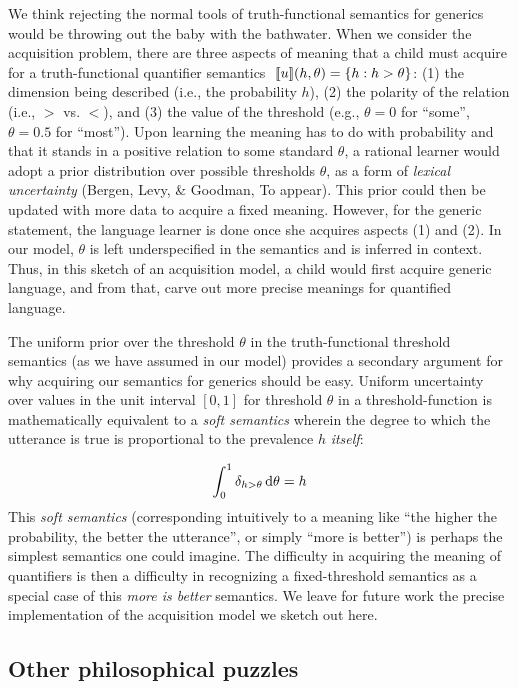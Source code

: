 \documentclass[english,floatsintext,man]{apa6}
\theoremstyle{definition}
\theoremstyle{definition}
\theoremstyle{definition}
\theoremstyle{remark}
\begin{document}
We think rejecting the normal tools of truth-functional semantics for
generics would be throwing out the baby with the bathwater. When we
consider the acquisition problem, there are three aspects of meaning
that a child must acquire for a truth-functional quantifier semantics
\(\mbox{ $[\![ u ]\!]$}(h, \theta) = \{h :h > \theta\}\): (1) the dimension being
described (i.e., the probability \(h\)), (2) the polarity of the
relation (i.e., \(>\) vs. \(<\)), and (3) the value of the threshold
(e.g., \(\theta = 0\) for \enquote{some}, \(\theta = 0.5\) for
\enquote{most}). Upon learning the meaning has to do with probability
and that it stands in a positive relation to some standard \(\theta\), a
rational learner would adopt a prior distribution over possible
thresholds \(\theta\), as a form of \emph{lexical uncertainty} (Bergen,
Levy, \& Goodman, To appear). This prior could then be updated with more
data to acquire a fixed meaning. However, for the generic statement, the
language learner is done once she acquires aspects (1) and (2). In our
model, \(\theta\) is left underspecified in the semantics and is
inferred in context. Thus, in this sketch of an acquisition model, a
child would first acquire generic language, and from that, carve out
more precise meanings for quantified language.

The uniform prior over the threshold \(\theta\) in the truth-functional
threshold semantics (as we have assumed in our model) provides a
secondary argument for why acquiring our semantics for generics should
be easy. Uniform uncertainty over values in the unit interval \([0, 1]\)
for threshold \(\theta\) in a threshold-function is mathematically
equivalent to a \emph{soft semantics} wherein the degree to which the
utterance is true is proportional to the prevalence \(h\) \emph{itself}:

\[
\int_{0}^{1} \delta_{h > \theta} \mathop{}\!\mathrm{d} \theta =  h
\] This \emph{soft semantics} (corresponding intuitively to a meaning
like \enquote{the higher the probability, the better the utterance}, or
simply \enquote{more is better}) is perhaps the simplest semantics one
could imagine. The difficulty in acquiring the meaning of quantifiers is
then a difficulty in recognizing a fixed-threshold semantics as a
special case of this \emph{more is better} semantics. We leave for
future work the precise implementation of the acquisition model we
sketch out here.

\subsection{Other philosophical
puzzles}\label{other-philosophical-puzzles}
\end{document}
